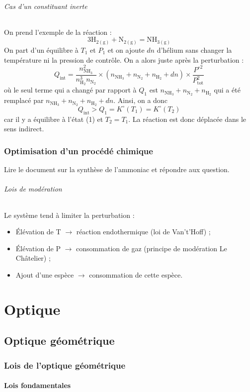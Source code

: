 \documentclass[french]{book}
\theoremstyle{plain}
\theoremstyle{definition}
\theoremstyle{remark}
\begin{document}
\paragraph{Cas d'un constituant inerte} On prend l'exemple de la réaction : $$3\text{H}_{2(\text{g})}+\text{N}_{2(\text{g})}=\text{NH}_{3(\text{g})}$$ On part d'un équilibre à $T_1$ et $P_1$ et on ajoute $dn$ d'hélium sans changer la température ni la pression de contrôle. On a alors juste après la perturbation : $$Q_\text{int}=\frac{n_{\text{NH}_3}^2}{n_{\text{H}_{2}}^3n_{\text{N}_2}}\times\left(n_{\text{NH}_3}+n_{\text{N}_2}+n_{\text{H}_2}+dn\right)\times\frac{P^{\circ 2}}{P_\text{tot}^2}$$ où le seul terme qui a changé par rapport à $Q_1$ est $n_{\text{NH}_3}+n_{\text{N}_2}+n_{\text{H}_2}$ qui a été remplacé par $n_{\text{NH}_3}+n_{\text{N}_2}+n_{\text{H}_2}+dn$. Ainsi, on a donc $$Q_\text{int}>Q_1=K^\circ(T_1)=K^\circ(T_2)$$ car il y a équilibre à l'état (1) et $T_2=T_1$. La réaction est donc déplacée dans le sens indirect.
\section{Optimisation d'un procédé chimique}
Lire le document sur la synthèse de l'ammoniac et répondre aux question.
\paragraph{Lois de modération} Le système tend à limiter la perturbation :
\begin{itemize}
	\item Élévation de T $\to$ réaction endothermique (loi de Van’t’Hoff) ;
	\item Élévation de P $\to$ consommation de gaz (principe de modération Le Châtelier) ;
	\item Ajout d’une espèce $\to$ consommation	de cette espèce.
\end{itemize}

\part{Optique}
\chapter{Optique géométrique}
\localtableofcontents
\section{Lois de l'optique géométrique}
\subsection{Lois fondamentales}
\end{document}
